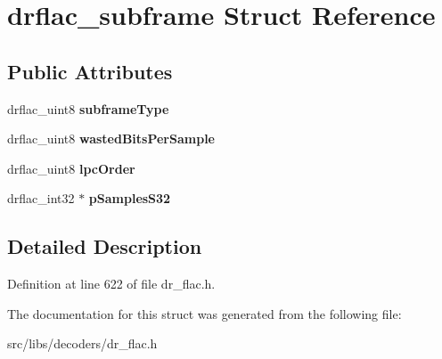\hypertarget{structdrflac__subframe}{\section{drflac\-\_\-subframe Struct Reference}
\label{structdrflac__subframe}
}
\subsection*{Public Attributes}
\begin{DoxyCompactItemize}
\item 
\hypertarget{structdrflac__subframe_a6e00e12ce74b76f1fcdc78d8d00bef73}{drflac\-\_\-uint8 {\bfseries subframe\-Type}}\label{structdrflac__subframe_a6e00e12ce74b76f1fcdc78d8d00bef73}

\item 
\hypertarget{structdrflac__subframe_abd3a8d468312bf6426db6e8125a8ebb7}{drflac\-\_\-uint8 {\bfseries wasted\-Bits\-Per\-Sample}}\label{structdrflac__subframe_abd3a8d468312bf6426db6e8125a8ebb7}

\item 
\hypertarget{structdrflac__subframe_afe4e457d6fc4a858b6aab8993666b199}{drflac\-\_\-uint8 {\bfseries lpc\-Order}}\label{structdrflac__subframe_afe4e457d6fc4a858b6aab8993666b199}

\item 
\hypertarget{structdrflac__subframe_ae899af4ae4f6d830e4fce95d5886517f}{drflac\-\_\-int32 $\ast$ {\bfseries p\-Samples\-S32}}\label{structdrflac__subframe_ae899af4ae4f6d830e4fce95d5886517f}

\end{DoxyCompactItemize}


\subsection{Detailed Description}


Definition at line 622 of file dr\-\_\-flac.\-h.



The documentation for this struct was generated from the following file\-:\begin{DoxyCompactItemize}
\item 
src/libs/decoders/dr\-\_\-flac.\-h\end{DoxyCompactItemize}
